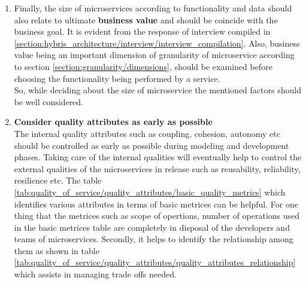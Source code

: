 \begin{enumerate}
\begin{enumerate}
\item Finally, the size of microservices according to functionality and data should also relate to ultimate \textbf{business value} and should be coincide with the business goal. It is evident from the response of interview compiled in \ref{section:hybris_architecture/interview/interview_compilation}. Also, business value being an important dimension of granularity of microservice according to section \ref{section:granularity/dimensions}, should be examined before choosing the functionality being performed by a service.\\
So, while deciding about the size of microservice the mentioned factors should be well considered.

\item \textbf{Consider quality attributes as early as possible} \\
The internal quality attributes such as coupling, cohesion, autonomy etc should be controlled as early as possible during modeling and development phases. Taking care of the internal qualities will eventually help to control the external qualities of the microservices in release such as reusability, reliability, resilience etc. The table \ref{tab:quality_of_service/quality_attributes/basic_quality_metrics} which identifies various attributes in terms of basic metrices can be helpful. For one thing that the metrices such as scope of opertions, number of operations used in the basic metrices table are completely in disposal of the developers and teams of microservices. Secondly, it helps to identify the relationship among them as shown in table \ref{tab:quality_of_service/quality_attributes/quality_attributes_relationship} which assists in managing trade offs needed.


\end{enumerate}
\end{enumerate}
